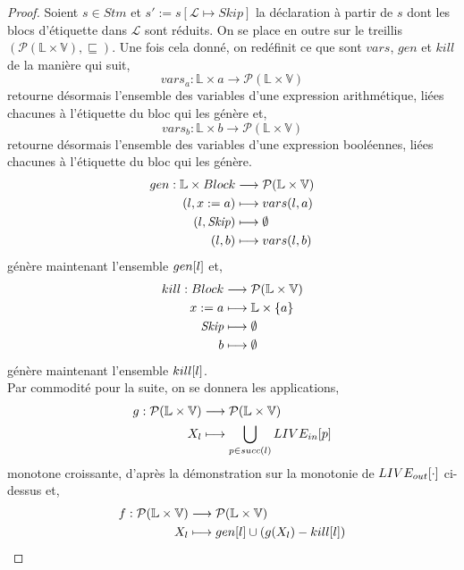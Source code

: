 \documentclass[a4paper, 12pt]{article}
\begin{document}
\begin{proof}
	Soient $s \in Stm$ et $s' := s[\mathcal{L} \longmapsto Skip]$ la déclaration à partir de $s$ dont les blocs d'étiquette 
	dans $\mathcal{L}$ sont réduits. 
	On se place en outre sur le treillis $(\mathcal{P}(\mathbb{L} \times \mathbb{V}), \sqsubseteq)$. 
	Une fois cela donné, on redéfinit ce que sont $vars$, $gen$ et $kill$ de la manière qui suit, 
	\[vars_a : \mathbb{L} \times a \longrightarrow \mathcal{P}(\mathbb{L} \times \mathbb{V})\]
	retourne désormais l'ensemble des variables d'une expression arithmétique, liées chacunes à l'étiquette du bloc qui les génère et,
	\[vars_b : \mathbb{L} \times b \longrightarrow \mathcal{P}(\mathbb{L} \times \mathbb{V})\]
	retourne désormais l'ensemble des variables d'une expression booléennes, liées chacunes à l'étiquette du bloc qui les génère.
	\begin{align*}
		gen : \mathbb{L} \times Block &\longrightarrow \mathcal{P}(\mathbb{L} \times \mathbb{V})\\
		(l, {x}\space:=\space{a}) &\longmapsto vars(l, a)\\
		(l, \textit{Skip}) &\longmapsto \emptyset\\
		(l, b) &\longmapsto vars(l, b)
	\end{align*}
	génère maintenant l'ensemble $gen[l]$ et,
	\begin{align*}
		kill : Block &\longrightarrow \mathcal{P}(\mathbb{L} \times \mathbb{V})\\
		{x}\space:=\space{a} &\longmapsto \mathbb{L} \times \{a\}\\
		\textit{Skip} &\longmapsto \emptyset\\
		b &\longmapsto \emptyset
	\end{align*}
	génère maintenant l'ensemble $kill[l]$.
	\\ 
	Par commodité pour la suite, on se donnera les applications,
	\begin{align*}
		g : \mathcal{P}(\mathbb{L} \times \mathbb{V}) &\longrightarrow \mathcal{P}(\mathbb{L} \times \mathbb{V})\\
		X_l &\longmapsto \bigcup\limits_{p\in succ(l)} LIVE_{in}[p]
	\end{align*}
	monotone croissante, d'après la démonstration sur la monotonie de $LIVE_{out}[\cdot]$ ci-dessus et,
	\begin{align*}
		f : \mathcal{P}(\mathbb{L} \times \mathbb{V}) &\longrightarrow \mathcal{P}(\mathbb{L} \times \mathbb{V})\\
		X_l &\longmapsto gen[l] \cup (g(X_l) - kill[l])
	\end{align*}

\end{proof}
\end{document}
